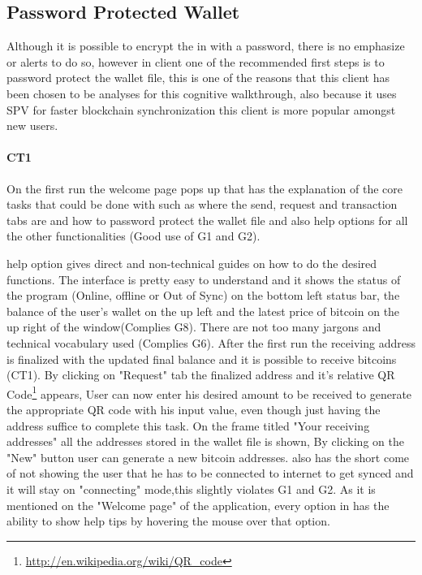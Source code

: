 
\subsection{Password Protected Wallet}
Although it is possible to encrypt the \walletfile in \bitcoinclient with a password, there is no emphasize or alerts to do so, however in \multibit client one of the recommended first steps is to password protect the wallet file, this is one of the reasons that this client has been chosen to be analyses for this cognitive walkthrough, also because it uses SPV for faster blockchain synchronization this client is more popular amongst new users.

\paragraph{CT1}On the first run the welcome page pops up that has the explanation of the core tasks that could be done with \multibit such as where the send, request and transaction tabs are and how to password protect the wallet file and also help options for all the other functionalities (Good use of G1 and G2). 

\multibit help option gives direct and non-technical guides on how to do the desired functions. The interface is pretty easy to understand and it shows the status of the program (Online, offline or Out of Sync) on the bottom left  status bar, the balance of the user's wallet on the up left and the latest price of bitcoin on the up right of the window(Complies G8). There are not too many jargons and technical vocabulary used (Complies G6). After the first run the receiving address is finalized with the updated final balance and it is possible to receive bitcoins (CT1). By clicking on "Request" tab the finalized address and it's relative QR Code\footnote{\url{http://en.wikipedia.org/wiki/QR_code}} appears, User can now enter his desired amount to be received to generate the appropriate QR code with his input value, even though just having the address suffice to complete this task. On the frame titled "Your receiving addresses" all the addresses stored in the wallet file is shown, By clicking on the "New" button user can generate a new bitcoin addresses. \multibit also has the short come of not showing the user that he has to be connected to internet to get synced and it will stay on "connecting" mode,this slightly violates G1 and G2.
As it is mentioned on the "Welcome page" of the application, every option in \multibit has the ability to show help tips by hovering the mouse over that option.

